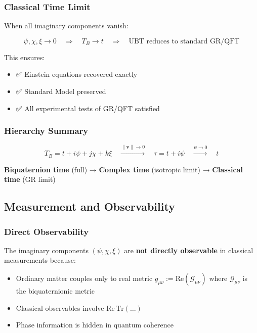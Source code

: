 \subsubsection{Classical Time Limit}

When all imaginary components vanish:

\begin{equation}
\label{eq:canonical:real_limit}
\psi, \chi, \xi \to 0 \quad \Rightarrow \quad T_B \to t \quad \Rightarrow \quad \text{UBT reduces to standard GR/QFT}
\end{equation}

This ensures:
\begin{itemize}
    \item ✅ Einstein equations recovered exactly
    \item ✅ Standard Model preserved
    \item ✅ All experimental tests of GR/QFT satisfied
\end{itemize}

\subsubsection{Hierarchy Summary}

\begin{equation}
\boxed{T_B = t + i\psi + j\chi + k\xi \quad \xrightarrow{\|\mathbf{v}\| \to 0} \quad \tau = t + i\psi \quad \xrightarrow{\psi \to 0} \quad t}
\end{equation}

\textbf{Biquaternion time} (full) → \textbf{Complex time} (isotropic limit) → \textbf{Classical time} (GR limit)

\subsection{Measurement and Observability}

\subsubsection{Direct Observability}

The imaginary components $(\psi, \chi, \xi)$ are \textbf{not directly observable} in classical measurements because:
\begin{itemize}
    \item Ordinary matter couples only to real metric $g_{\mu\nu} := \text{Re}(\mathcal{G}_{\mu\nu})$ where $\mathcal{G}_{\mu\nu}$ is the biquaternionic metric
    \item Classical observables involve $\text{Re}\,\text{Tr}(\ldots)$
    \item Phase information is hidden in quantum coherence
\end{itemize}

